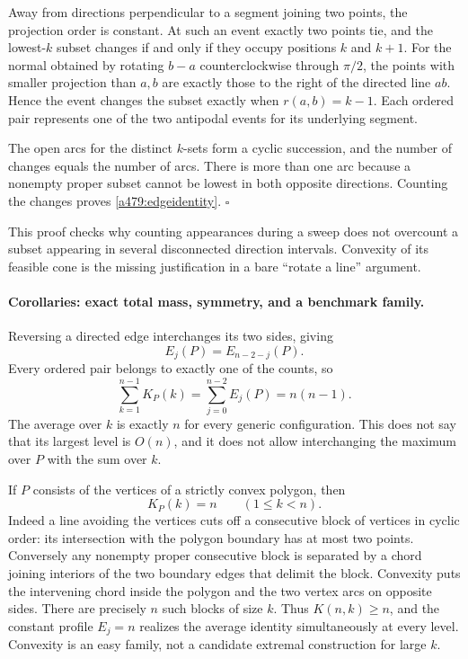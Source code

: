 \documentclass[11pt]{article}
\begin{document}
Away from directions perpendicular to a segment joining two points, the
projection order is constant. At such an event exactly two points tie,
and the lowest-$k$ subset changes if and only if they occupy positions
$k$ and $k+1$. For the normal obtained by rotating $b-a$ counterclockwise
through $\pi/2$, the points with smaller projection than $a,b$ are
exactly those to the right of the directed line $ab$. Hence the event
changes the subset exactly when $r(a,b)=k-1$. Each ordered pair represents
one of the two antipodal events for its underlying segment.

The open arcs for the distinct $k$-sets form a cyclic succession, and
the number of changes equals the number of arcs. There is more than one
arc because a nonempty proper subset cannot be lowest in both opposite
directions. Counting the changes proves \eqref{a479:edgeidentity}.
\hfill$\square$

This proof checks why counting appearances during a sweep does not
overcount a subset appearing in several disconnected direction intervals.
Convexity of its feasible cone is the missing justification in a bare
``rotate a line'' argument.

\paragraph{Corollaries: exact total mass, symmetry, and a benchmark family.}
Reversing a directed edge interchanges its two sides, giving
\begin{equation}\label{a479:symmetry}
                    E_j(P)=E_{n-2-j}(P).
\end{equation}
Every ordered pair belongs to exactly one of the counts, so
\begin{equation}\label{a479:total}
       \sum_{k=1}^{n-1}K_P(k)=\sum_{j=0}^{n-2}E_j(P)=n(n-1).
\end{equation}
The average over $k$ is exactly $n$ for every generic configuration.
This does not say that its largest level is $O(n)$, and it does not allow
interchanging the maximum over $P$ with the sum over $k$.

If $P$ consists of the vertices of a strictly convex polygon, then
\begin{equation}\label{a479:convex}
                              K_P(k)=n\qquad(1\leq k<n).
\end{equation}
Indeed a line avoiding the vertices cuts off a consecutive block of vertices
in cyclic order: its intersection with the polygon boundary has at most
two points. Conversely any nonempty proper consecutive block is separated
by a chord joining interiors of the two boundary edges that delimit the
block. Convexity puts the intervening chord inside the polygon and the two
vertex arcs on opposite sides. There are precisely $n$ such blocks of
size $k$. Thus $K(n,k)\geq n$, and the constant profile $E_j=n$
realizes the average identity simultaneously at every level. Convexity is
an easy family, not a candidate extremal construction for large $k$.
\end{document}
